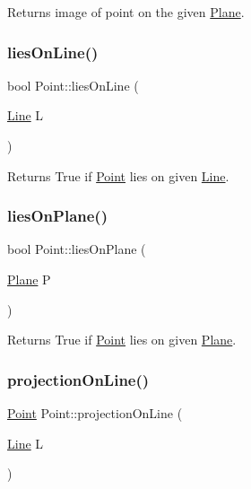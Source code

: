 Returns image of point on the given \mbox{\hyperlink{class_plane}{Plane}}. 

\mbox{\label{class_point_addde199c01d6de0ce974fd7b89e4cba4}} 
\subsubsection{\texorpdfstring{lies\+On\+Line()}{liesOnLine()}}
{\footnotesize\ttfamily bool Point\+::lies\+On\+Line (\begin{DoxyParamCaption}\item[{\mbox{\hyperlink{class_line}{Line}}}]{L }\end{DoxyParamCaption})}



Returns True if \mbox{\hyperlink{class_point}{Point}} lies on given \mbox{\hyperlink{class_line}{Line}}. 

\mbox{\label{class_point_ace2ed8e26893f5659e9f4fe94dc67094}} 
\subsubsection{\texorpdfstring{lies\+On\+Plane()}{liesOnPlane()}}
{\footnotesize\ttfamily bool Point\+::lies\+On\+Plane (\begin{DoxyParamCaption}\item[{\mbox{\hyperlink{class_plane}{Plane}}}]{P }\end{DoxyParamCaption})}



Returns True if \mbox{\hyperlink{class_point}{Point}} lies on given \mbox{\hyperlink{class_plane}{Plane}}. 

\mbox{\label{class_point_a61cefcc9a49eed720f97ccea7bed5981}} 
\subsubsection{\texorpdfstring{projection\+On\+Line()}{projectionOnLine()}}
{\footnotesize\ttfamily \mbox{\hyperlink{class_point}{Point}} Point\+::projection\+On\+Line (\begin{DoxyParamCaption}\item[{\mbox{\hyperlink{class_line}{Line}}}]{L }\end{DoxyParamCaption})}



